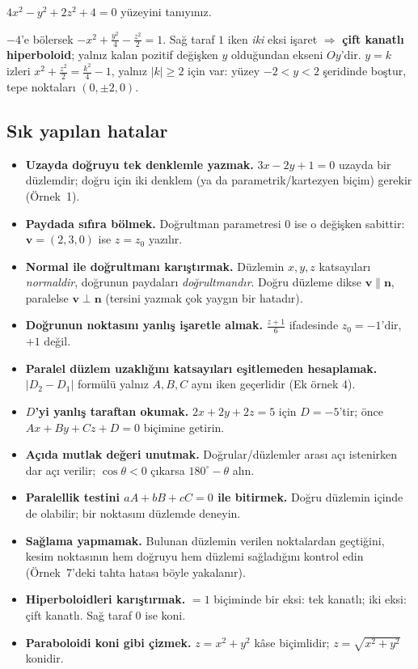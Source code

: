 \begin{soru}
$4x^2-y^2+2z^2+4=0$ yüzeyini tanıyınız.
\end{soru}
\begin{cevap}
$-4$'e bölersek $-x^2+\frac{y^2}{4}-\frac{z^2}{2}=1$. Sağ taraf $1$ iken \emph{iki} eksi işaret $\Rightarrow$ \textbf{çift kanatlı hiperboloid}; yalnız kalan pozitif değişken $y$ olduğundan ekseni $Oy$'dir. $y=k$ izleri $x^2+\frac{z^2}{2}=\frac{k^2}{4}-1$, yalnız $|k|\ge2$ için var: yüzey $-2<y<2$ şeridinde boştur, tepe noktaları $(0,\pm2,0)$.
\end{cevap}

\subsection{Sık yapılan hatalar}

\begin{dikkat}
\begin{itemize}
  \item \textbf{Uzayda doğruyu tek denklemle yazmak.} $3x-2y+1=0$ uzayda bir düzlemdir; doğru için iki denklem (ya da parametrik/kartezyen biçim) gerekir (Örnek~1).
  \item \textbf{Paydada sıfıra bölmek.} Doğrultman parametresi $0$ ise o değişken sabittir: $\mathbf v=(2,3,0)$ ise $z=z_0$ yazılır.
  \item \textbf{Normal ile doğrultmanı karıştırmak.} Düzlemin $x,y,z$ katsayıları \emph{normaldir}, doğrunun paydaları \emph{doğrultmandır}. Doğru düzleme dikse $\mathbf v\parallel\mathbf n$, paralelse $\mathbf v\perp\mathbf n$ (tersini yazmak çok yaygın bir hatadır).
  \item \textbf{Doğrunun noktasını yanlış işaretle almak.} $\frac{z+1}{6}$ ifadesinde $z_0=-1$'dir, $+1$ değil.
  \item \textbf{Paralel düzlem uzaklığını katsayıları eşitlemeden hesaplamak.} $|D_2-D_1|$ formülü yalnız $A,B,C$ aynı iken geçerlidir (Ek örnek 4).
  \item \textbf{$D$'yi yanlış taraftan okumak.} $2x+2y+2z=5$ için $D=-5$'tir; önce $Ax+By+Cz+D=0$ biçimine getirin.
  \item \textbf{Açıda mutlak değeri unutmak.} Doğrular/düzlemler arası açı istenirken dar açı verilir; $\cos\theta<0$ çıkarsa $180^\circ-\theta$ alın.
  \item \textbf{Paralellik testini $aA+bB+cC=0$ ile bitirmek.} Doğru düzlemin içinde de olabilir; bir noktasını düzlemde deneyin.
  \item \textbf{Sağlama yapmamak.} Bulunan düzlemin verilen noktalardan geçtiğini, kesim noktasının hem doğruyu hem düzlemi sağladığını kontrol edin (Örnek~7'deki tahta hatası böyle yakalanır).
  \item \textbf{Hiperboloidleri karıştırmak.} $=1$ biçiminde bir eksi: tek kanatlı; iki eksi: çift kanatlı. Sağ taraf $0$ ise koni.
  \item \textbf{Paraboloidi koni gibi çizmek.} $z=x^2+y^2$ kâse biçimlidir; $z=\sqrt{x^2+y^2}$ konidir.
\end{itemize}
\end{dikkat}


